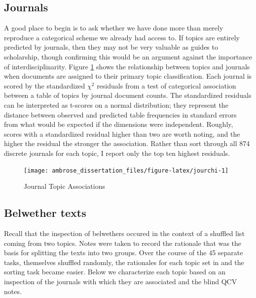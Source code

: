\documentclass[]{book}
\theoremstyle{definition}
\theoremstyle{definition}
\theoremstyle{definition}
\theoremstyle{remark}
\begin{document}
\hypertarget{journals}{%
\subsection{Journals}\label{journals}}

A good place to begin is to ask whether we have done more than merely
reproduce a categorical scheme we already had access to. If topics are
entirely predicted by journals, then they may not be very valuable as
guides to scholarship, though confirming this would be an argument
against the importance of interdisciplinarity. Figure \ref{fig:jourchi}
shows the relationship between topics and journals when documents are
assigned to their primary topic classification. Each journal is scored
by the standardized \(\chi^2\) residuals from a test of categorical
association between a table of topics by journal document counts. The
standardized residuals can be interpreted as t-scores on a normal
distribution; they represent the distance between observed and predicted
table frequencies in standard errors from what would be expected if the
dimensions were independent. Roughly, scores with a standardized
residual higher than two are worth noting, and the higher the residual
the stronger the association. Rather than sort through all 874 discrete
journals for each topic, I report only the top ten highest residuals.

\begin{figure}

{\centering \texttt{[image: ambrose\_dissertation\_files/figure-latex/jourchi-1]} 

}

\caption{Journal Topic Associations}\label{fig:jourchi}
\end{figure}

\hypertarget{belwether-texts}{%
\subsection{Belwether texts}\label{belwether-texts}}

Recall that the inspection of belwethers occured in the context of a
shuffled list coming from two topics. Notes were taken to record the
rationale that was the basis for splitting the texts into two groups.
Over the course of the 45 separate tasks, themselves shuffled randomly,
the rationales for each topic set in and the sorting task became easier.
Below we characterize each topic based on an inspection of the journals
with which they are associated and the blind QCV notes.
\end{document}
